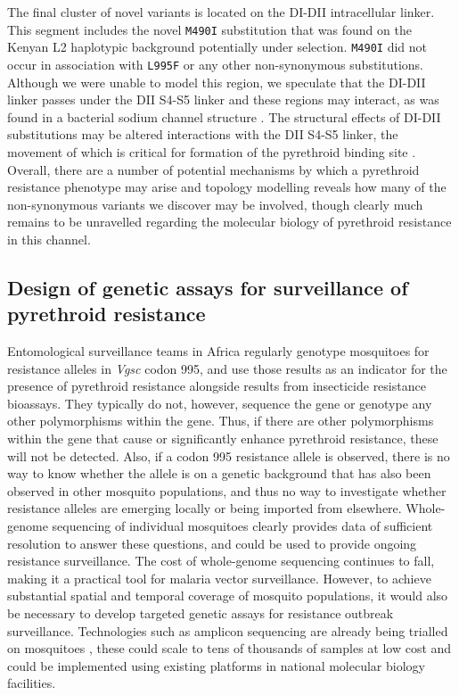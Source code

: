 \documentclass[a4paper,11pt,abstracton,hidelinks]{scrartcl}
\begin{document}
%
The final cluster of novel variants is located on the DI-DII intracellular linker.
%
This segment includes the novel \texttt{M490I} substitution that was found on the Kenyan L2 haplotypic background potentially under selection.
%
\texttt{M490I} did not occur in association with \texttt{L995F} or any other non-synonymous substitutions.
%
Although we were unable to model this region, we speculate that the DI-DII linker passes under the DII S4-S5 linker and these regions may interact, as was found in a bacterial sodium channel structure \cite{Sula2017}.
%
The structural effects of DI-DII substitutions may be altered interactions with the DII S4-S5 linker, the movement of which is critical for formation of the pyrethroid binding site \cite{OReilly2006, Usherwood2007}.
%
Overall, there are a number of potential mechanisms by which a pyrethroid resistance phenotype may arise and topology modelling reveals how many of the non-synonymous variants we discover may be involved, though clearly much remains to be unravelled regarding the molecular biology of pyrethroid resistance in this channel.


\subsection*{Design of genetic assays for surveillance of pyrethroid resistance}

%
Entomological surveillance teams in Africa regularly genotype mosquitoes for resistance alleles in \textit{Vgsc} codon 995, and use those results as an indicator for the presence of pyrethroid resistance alongside results from insecticide resistance bioassays.
%
They typically do not, however, sequence the gene or genotype any other polymorphisms within the gene.
%
Thus, if there are other polymorphisms within the gene that cause or significantly enhance pyrethroid resistance, these will not be detected.
%
Also, if a codon 995 resistance allele is observed, there is no way to know whether the allele is on a genetic background that has also been observed in other mosquito populations, and thus no way to investigate whether resistance alleles are emerging locally or being imported from elsewhere.
%
Whole-genome sequencing of individual mosquitoes clearly provides data of sufficient resolution to answer these questions, and could be used to provide ongoing resistance surveillance.
%
The cost of whole-genome sequencing continues to fall, making it a practical tool for malaria vector surveillance.
%
However, to achieve substantial spatial and temporal coverage of mosquito populations, it would also be necessary to develop targeted genetic assays for resistance outbreak surveillance.
%
Technologies such as amplicon sequencing \cite{Kilianski2015} are already being trialled on mosquitoes \cite{lucas2019high}, these could scale to tens of thousands of samples at low cost and could be implemented using existing platforms in national molecular biology facilities.
%
\end{document}
